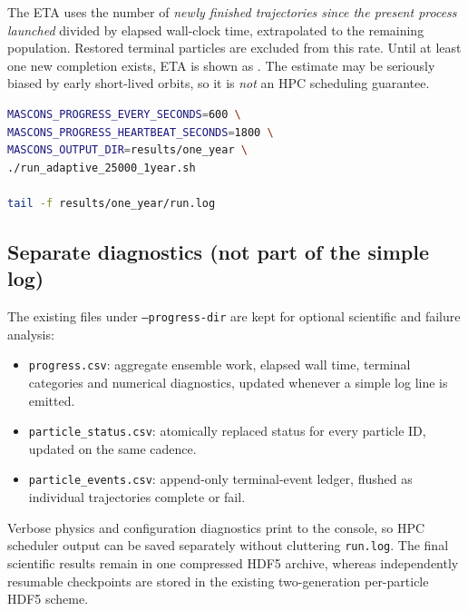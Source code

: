 \documentclass[11pt,a4paper]{article}
\newcommand{\opt}[1]{\texttt{#1}}
\newcommand{\pathcode}[1]{\nolinkurl{#1}}
\newcommand{\kbd}[1]{\texttt{\detokenize{#1}}}
\begin{document}
The ETA uses the number of \emph{newly finished trajectories since the present
process launched} divided by elapsed wall-clock time, extrapolated to the
remaining population. Restored terminal particles are excluded from this
rate. Until at least one new completion exists, ETA is shown as
\kbd{unknown}. The estimate may be seriously biased by early short-lived
orbits, so it is \emph{not} an HPC scheduling guarantee.

\begin{lstlisting}[language=bash]
MASCONS_PROGRESS_EVERY_SECONDS=600 \
MASCONS_PROGRESS_HEARTBEAT_SECONDS=1800 \
MASCONS_OUTPUT_DIR=results/one_year \
./run_adaptive_25000_1year.sh

tail -f results/one_year/run.log
\end{lstlisting}

\subsection{Separate diagnostics (not part of the simple log)}
The existing files under \opt{--progress-dir} are kept for optional scientific
and failure analysis:
\begin{itemize}
\item \pathcode{progress.csv}: aggregate ensemble work, elapsed wall time,
terminal categories and numerical diagnostics, updated whenever a simple
log line is emitted.
\item \pathcode{particle_status.csv}: atomically replaced status for every
particle ID, updated on the same cadence.
\item \pathcode{particle_events.csv}: append-only terminal-event ledger, flushed
as individual trajectories complete or fail.
\end{itemize}
Verbose physics and configuration diagnostics print to the console, so HPC
scheduler output can be saved separately without cluttering
\pathcode{run.log}. The final scientific results remain in one compressed
HDF5 archive, whereas independently resumable checkpoints are stored in
the existing two-generation per-particle HDF5 scheme.
\end{document}
